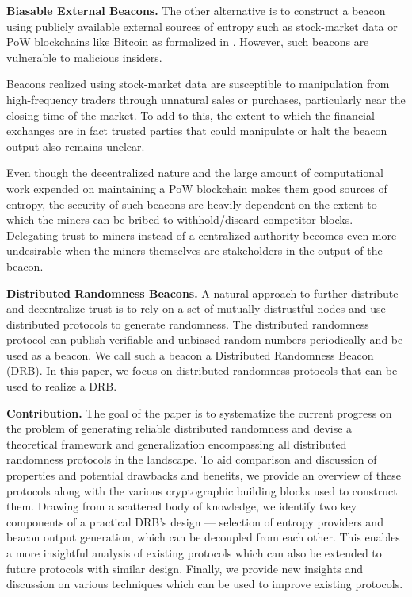 \documentclass[letterpaper,twocolumn,10pt]{article}
\theoremstyle{definition}
\theoremstyle{remark}
\begin{document}
\textbf{Biasable External Beacons.} The other alternative is to construct a beacon using publicly available external sources of entropy such as stock-market data \cite{clark2010use} or PoW blockchains like Bitcoin \cite{nakamoto2019bitcoin} as formalized in \cite{bonneau2015bitcoin}. However, such beacons are vulnerable to malicious insiders. 

Beacons realized using stock-market data are susceptible to manipulation from high-frequency traders through unnatural sales or purchases, particularly near the closing time of the market. To add to this, the extent to which the financial exchanges are in fact trusted parties that could manipulate or halt the beacon output also remains unclear.

Even though the decentralized nature and the large amount of computational work expended on maintaining a PoW blockchain makes them good sources of entropy, the security of such beacons are heavily dependent on the extent to which the miners can be bribed to withhold/discard competitor blocks. Delegating trust to  miners instead of a centralized authority becomes even more undesirable when the miners themselves are stakeholders in the output of the beacon.

\textbf{Distributed Randomness Beacons.} 
A natural approach to further distribute and decentralize trust is to rely on a set of mutually-distrustful nodes and use distributed protocols to generate randomness. The distributed randomness protocol can publish verifiable and unbiased random numbers periodically and be used as a beacon. We call such a beacon a Distributed Randomness Beacon (DRB). In this paper, we focus on distributed randomness protocols that can be used to realize a DRB.

\textbf{Contribution.} The goal of the paper is to systematize the current progress on the problem of generating reliable distributed randomness and devise a theoretical framework and generalization encompassing all distributed randomness protocols in the landscape. To aid comparison and discussion of properties and potential drawbacks and benefits, we provide an overview of these protocols along with the various cryptographic building blocks used to construct them. Drawing from a scattered body of knowledge, we identify two key components of a practical DRB's design --- selection of entropy providers and beacon output generation, which can be decoupled from each other. This enables a more insightful analysis of existing protocols which can also be extended to future protocols with similar design. Finally, we provide new insights and discussion on various techniques which can be used to improve existing protocols.
\end{document}
